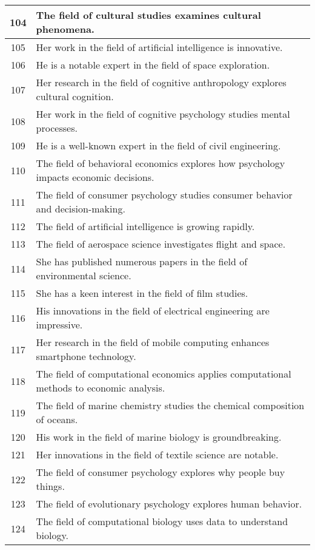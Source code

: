 \begin{longtable}{|c|p{12cm}|}
104 & The field of cultural studies examines cultural phenomena. \\ \hline
105 & Her work in the field of artificial intelligence is innovative. \\ \hline
106 & He is a notable expert in the field of space exploration. \\ \hline
107 & Her research in the field of cognitive anthropology explores cultural cognition. \\ \hline
108 & Her work in the field of cognitive psychology studies mental processes. \\ \hline
109 & He is a well-known expert in the field of civil engineering. \\ \hline
110 & The field of behavioral economics explores how psychology impacts economic decisions. \\ \hline
111 & The field of consumer psychology studies consumer behavior and decision-making. \\ \hline
112 & The field of artificial intelligence is growing rapidly. \\ \hline
113 & The field of aerospace science investigates flight and space. \\ \hline
114 & She has published numerous papers in the field of environmental science. \\ \hline
115 & She has a keen interest in the field of film studies. \\ \hline
116 & His innovations in the field of electrical engineering are impressive. \\ \hline
117 & Her research in the field of mobile computing enhances smartphone technology. \\ \hline
118 & The field of computational economics applies computational methods to economic analysis. \\ \hline
119 & The field of marine chemistry studies the chemical composition of oceans. \\ \hline
120 & His work in the field of marine biology is groundbreaking. \\ \hline
121 & Her innovations in the field of textile science are notable. \\ \hline
122 & The field of consumer psychology explores why people buy things. \\ \hline
123 & The field of evolutionary psychology explores human behavior. \\ \hline
124 & The field of computational biology uses data to understand biology. \\ \hline

\end{longtable}
